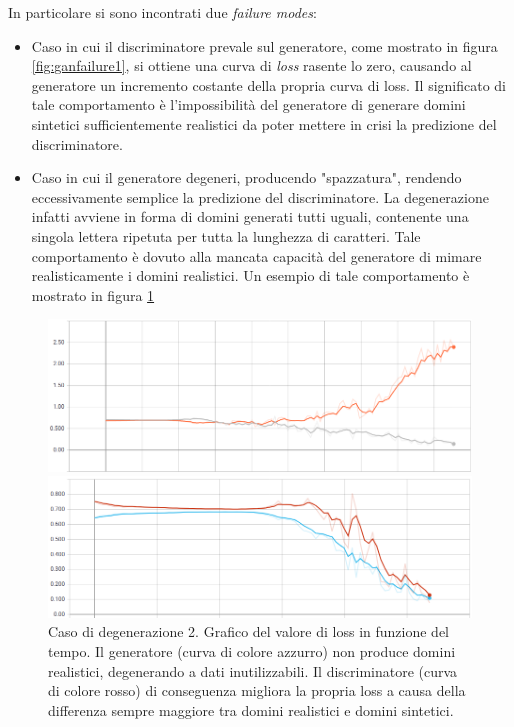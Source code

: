In particolare si sono incontrati due \textit{failure modes}:
\begin{itemize}
\item Caso in cui il discriminatore prevale sul generatore, come mostrato in figura \ref{fig:ganfailure1}, si ottiene una curva di \textit{loss} rasente lo zero, causando al generatore un incremento costante della propria curva di loss. Il significato di tale comportamento è l'impossibilità del generatore di generare domini sintetici sufficientemente realistici da poter mettere in crisi la predizione del discriminatore.
\item Caso in cui il generatore degeneri, producendo "spazzatura", rendendo eccessivamente semplice la predizione del discriminatore. La degenerazione infatti avviene in forma di domini generati tutti uguali, contenente una singola lettera ripetuta per tutta la lunghezza di caratteri. Tale comportamento è dovuto alla mancata capacità del generatore di mimare realisticamente i domini realistici. Un esempio di tale comportamento è mostrato in figura \ref{fig:ganfailure2}
\end{itemize}

\begin{figure}[!bp]
    \centering
    \includegraphics[width=0.6\columnwidth]{figures/gan/ganfailure1.png}
    \caption{Caso di degenerazione 1. Grafico del valore di loss in funzione del tempo. Il discriminatore (curva di colore grigio) prevale sul generatore (curva arancione), il quale non riesce a migliorare il proprio valore di loss.\label{fig:ganfailure1}}

    \centering
    \includegraphics[width=.6\columnwidth]{figures/gan/ganfailure2.png}
    \caption{Caso di degenerazione 2. Grafico del valore di loss in funzione del tempo. Il generatore (curva di colore azzurro) non produce domini realistici, degenerando a dati inutilizzabili. Il discriminatore (curva di colore rosso) di conseguenza migliora la propria loss a causa della differenza sempre maggiore tra domini realistici e domini sintetici. \label{fig:ganfailure2}}
\end{figure}

